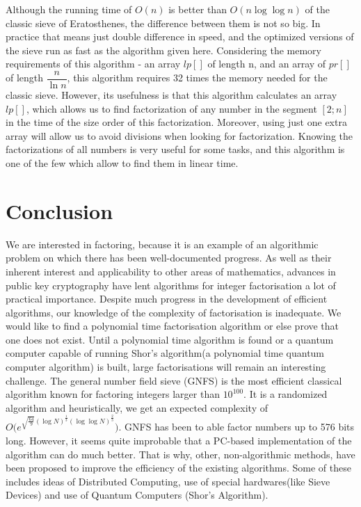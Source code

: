 \documentclass[11pt]{article}
\begin{document}
        Although the running time of $O\left( n\right) $ is better than $O\left( n\log \log n\right) $ of the classic sieve of Eratosthenes, the difference between them is not so big. In practice that means just double difference in speed, and the optimized versions of the sieve run as fast as the algorithm given here.
        Considering the memory requirements of this algorithm - an array $lp\left[ \right] $ of length n, and an array of $pr\left[ \right] $ of length $\dfrac {n}{\ln n}$, this algorithm requires 32 times the memory needed for the classic sieve.
        However, its usefulness is that this algorithm calculates an array $lp\left[ \right] $, which allows us to find factorization of any number in the segment $\left[ 2;n\right] $ in the time of the size order of this factorization. Moreover, using just one extra array will allow us to avoid divisions when looking for factorization.
        Knowing the factorizations of all numbers is very useful for some tasks, and this algorithm is one of the few which allow to find them in linear time.



\section*{Conclusion}
\begin{flushleft}
    We are interested in factoring, because it is an example of an algorithmic problem on which there has been well-documented progress. As well as their inherent interest and applicability to other areas of mathematics, advances in public key cryptography have lent algorithms for integer factorisation a lot of practical importance. Despite much progress in the development of efficient algorithms, our knowledge of the complexity of factorisation is inadequate. We would like to find a polynomial time factorisation algorithm or else prove that one does not exist. Until a polynomial time algorithm is found or a quantum computer capable of running Shor's algorithm(a polynomial time quantum computer algorithm) is built, large factorisations will remain an interesting challenge.
    \break \break
    The general number field sieve (GNFS) is the most efficient classical algorithm known for factoring integers larger than $10^{100}$. It is a randomized algorithm and heuristically, we get an expected complexity of $O\Big(e^{\sqrt{\frac{64}{9}}(\log N)^{\frac 13}(\log\log N)^{\frac 23}}\Big)$.\break
    GNFS has been to able factor numbers up to 576 bits long. However, it seems quite improbable that a PC-based implementation of the algorithm can do much better. That is why, other, non-algorithmic methods, have been proposed to improve the efficiency of the existing algorithms.\break \break
    Some of these includes ideas of Distributed Computing, use of special hardwares(like Sieve Devices) and use of Quantum Computers (Shor's Algorithm). 
    \end{flushleft}
\end{document}
